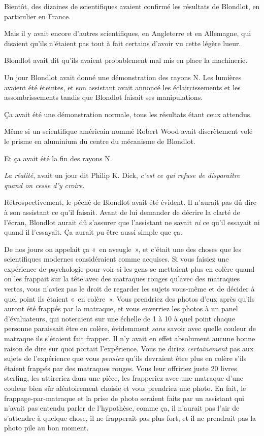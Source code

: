Bientôt, des dizaines de scientifiques avaient confirmé les résultats de Blondlot, en particulier en France.

Mais il y avait encore d'autres scientifiques, en Angleterre et en Allemagne, qui disaient qu'ils n'étaient pas tout à fait certains d'avoir vu cette légère lueur.

Blondlot avait dit qu'ils avaient probablement mal mis en place la machinerie.

Un jour Blondlot avait donné une démonstration des rayons N.
Les lumières avaient été éteintes, et son assistant avait annoncé les éclaircissements et les assombrissements tandis que Blondlot faisait ses manipulations.

Ça avait été une démonstration normale, tous les résultats étant ceux attendus.

Même si un scientifique américain nommé Robert Wood avait discrètement volé le prisme en aluminium du centre du mécanisme de Blondlot.

Et ça avait été la fin des rayons N.

\emph{La réalité}, avait un jour dit Philip K.
Dick, \emph{c'est ce qui refuse de disparaître quand on cesse d'y croire.}

Rétrospectivement, le péché de Blondlot avait été évident.
Il n'aurait pas dû dire à son assistant ce qu'il faisait.
Avant de lui demander de décrire la clarté de l'écran, Blondlot aurait dû s'assurer que l'assistant ne savait \emph{ni} ce qu'il essayait ni quand il l'essayait.
Ça aurait pu être aussi simple que ça.

De nos jours on appelait ça «~en aveugle~», et c'était une des choses que les scientifiques modernes considéraient comme acquises.
Si vous faisiez une expérience de psychologie pour voir si les gens se mettaient plus en colère quand on les frappait sur la tête avec des matraques rouges qu'avec des matraques vertes, vous n'aviez pas le droit de regarder les sujets vous-même et de décider à quel point ils étaient «~en colère~».
Vous prendriez des photos d'eux après qu'ils auront été frappés par la matraque, et vous enverriez les photos à un panel d'évaluateurs, qui noteraient sur une échelle de 1 à 10 à quel point chaque personne paraissait être en colère, évidemment \emph{sans} savoir avec quelle couleur de matraque ils s'étaient fait frapper.
Il n'y avait en effet absolument aucune bonne raison de dire sur quoi portait l'expérience.
Vous ne diriez \emph{certainement} pas aux sujets de l'expérience que vous \emph{pensiez} qu'ils devraient être plus en colère s'ils étaient frappés par des matraques rouges.
Vous leur offririez juste 20 livres sterling, les attireriez dans une pièce, les frapperiez avec une matraque d'une couleur bien sûr aléatoirement choisie et vous prendriez une photo.
En fait, le frappage-par-matraque et la prise de photo seraient faits par un assistant qui n'avait pas entendu parler de l'hypothèse, comme ça, il n'aurait pas l'air de s'attendre à quelque chose, il ne frapperait pas plus fort, et il ne prendrait pas la photo pile au bon moment.

